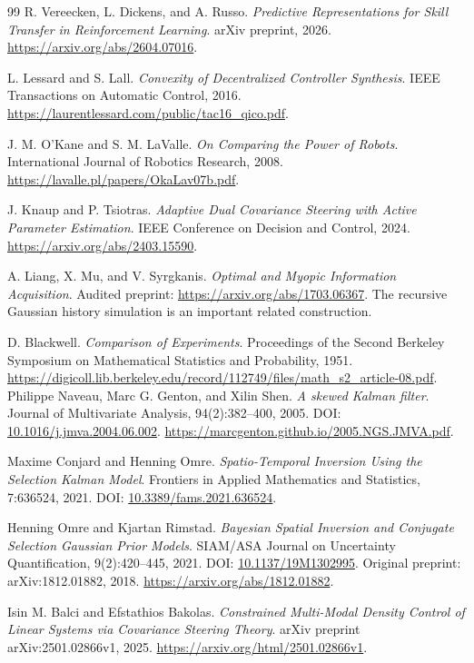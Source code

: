 \documentclass[UTF8,fontset=fandol,11pt,a4paper]{ctexart}
\theoremstyle{definition}
\theoremstyle{remark}
\numberwithin{equation}{section}
\begin{document}
\begin{thebibliography}{99}
 R. Vereecken, L. Dickens, and A. Russo.
\emph{Predictive Representations for Skill Transfer in Reinforcement Learning}.
arXiv preprint, 2026. \url{https://arxiv.org/abs/2604.07016}.

 L. Lessard and S. Lall.
\emph{Convexity of Decentralized Controller Synthesis}.
IEEE Transactions on Automatic Control, 2016.
\url{https://laurentlessard.com/public/tac16_qico.pdf}.

 J. M. O'Kane and S. M. LaValle.
\emph{On Comparing the Power of Robots}.
International Journal of Robotics Research, 2008.
\url{https://lavalle.pl/papers/OkaLav07b.pdf}.

 J. Knaup and P. Tsiotras.
\emph{Adaptive Dual Covariance Steering with Active Parameter Estimation}.
IEEE Conference on Decision and Control, 2024.
\url{https://arxiv.org/abs/2403.15590}.

 A. Liang, X. Mu, and V. Syrgkanis.
\emph{Optimal and Myopic Information Acquisition}.
Audited preprint: \url{https://arxiv.org/abs/1703.06367}.
The recursive Gaussian history simulation is an important related construction.

 D. Blackwell.
\emph{Comparison of Experiments}. Proceedings of the Second Berkeley Symposium on Mathematical Statistics and Probability, 1951.
\url{https://digicoll.lib.berkeley.edu/record/112749/files/math_s2_article-08.pdf}.
 Philippe Naveau, Marc G. Genton, and Xilin Shen.
\emph{A skewed Kalman filter}.
Journal of Multivariate Analysis, 94(2):382--400, 2005.
DOI: \href{https://doi.org/10.1016/j.jmva.2004.06.002}{10.1016/j.jmva.2004.06.002}.
\url{https://marcgenton.github.io/2005.NGS.JMVA.pdf}.

 Maxime Conjard and Henning Omre.
\emph{Spatio-Temporal Inversion Using the Selection Kalman Model}.
Frontiers in Applied Mathematics and Statistics, 7:636524, 2021.
DOI: \href{https://doi.org/10.3389/fams.2021.636524}{10.3389/fams.2021.636524}.

 Henning Omre and Kjartan Rimstad.
\emph{Bayesian Spatial Inversion and Conjugate Selection Gaussian Prior Models}.
SIAM/ASA Journal on Uncertainty Quantification, 9(2):420--445, 2021.
DOI: \href{https://doi.org/10.1137/19M1302995}{10.1137/19M1302995}.
Original preprint: arXiv:1812.01882, 2018.
\url{https://arxiv.org/abs/1812.01882}.

 Isin M. Balci and Efstathios Bakolas.
\emph{Constrained Multi-Modal Density Control of Linear Systems via Covariance Steering Theory}.
arXiv preprint arXiv:2501.02866v1, 2025.
\url{https://arxiv.org/html/2501.02866v1}.


\end{thebibliography}
\end{document}

